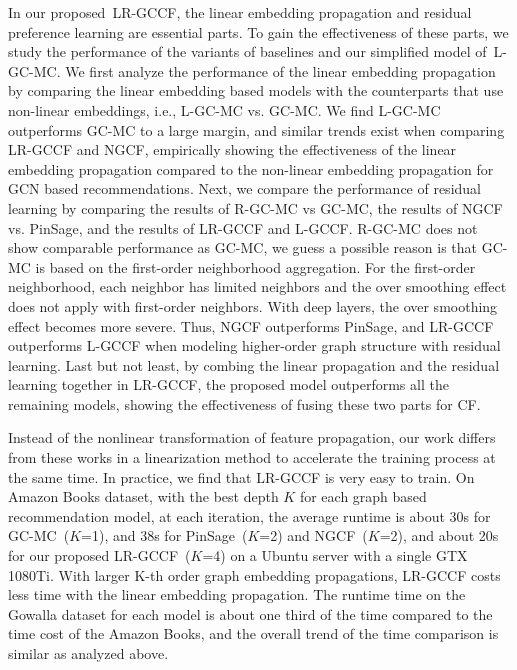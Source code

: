 \documentclass[letterpaper]{article} %
\begin{document}
 
In our proposed~LR-GCCF, the linear embedding propagation and residual preference learning are essential parts. To gain the effectiveness of these parts, we study the performance of the variants of baselines and our simplified model of~L-GC-MC.
We first analyze the performance of the linear embedding propagation by comparing the linear embedding based models with the counterparts that use non-linear embeddings, i.e., L-GC-MC vs. GC-MC. We find L-GC-MC outperforms GC-MC to a large margin, and similar trends exist
when comparing LR-GCCF and NGCF, empirically showing the effectiveness of the linear embedding propagation compared to the non-linear embedding propagation for GCN based recommendations. Next, we compare the performance of residual learning by comparing 
the results of  R-GC-MC vs GC-MC, the results of NGCF vs. PinSage, and the results of LR-GCCF and L-GCCF.  R-GC-MC does not show comparable performance as GC-MC, we guess a possible reason is that GC-MC is based on the first-order neighborhood aggregation. For the first-order neighborhood, each neighbor has limited neighbors and the over smoothing effect does not apply with first-order neighbors. With deep layers, the over smoothing effect  becomes more severe. Thus, NGCF outperforms PinSage, and LR-GCCF outperforms L-GCCF when modeling higher-order graph structure with residual learning. 
Last but not least, by combing the linear propagation and the residual learning together in LR-GCCF, the proposed model outperforms all the remaining models, showing the effectiveness of fusing these two parts for CF. 
  
 
Instead of the nonlinear transformation of  feature propagation, our work differs from these works in a linearization method to accelerate the training process at the same time. In practice, we find that LR-GCCF is very easy to train. On Amazon Books dataset, with the best depth $K$ for each graph based recommendation model, at each iteration, the average runtime is about 30s for GC-MC~($K$=1), and 38s for PinSage~($K$=2) and NGCF~($K$=2), and about 20s for our proposed LR-GCCF~($K$=4) on a Ubuntu server with a single GTX 1080Ti. With larger K-th order graph embedding propagations, LR-GCCF costs less time with the linear embedding propagation. The runtime time on the Gowalla dataset for each model is about one third of the time compared to the time cost of the Amazon Books, and the overall trend of the time comparison is similar as analyzed above.    
\end{document}
